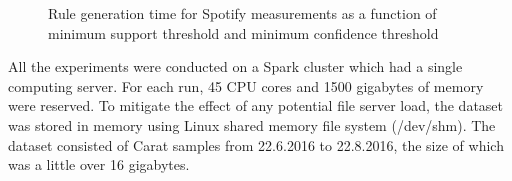 \begin{figure}[htp]



\caption{Rule generation time for Spotify measurements as a function of minimum support threshold and minimum confidence threshold}
\label{figure:runtimes-spotify}
\end{figure}

All the experiments were conducted on a Spark cluster which had a single computing server. For each run, 45 CPU cores and 1500 gigabytes of memory were reserved. To mitigate the effect of any potential file server load, the dataset was stored in memory using Linux shared memory file system (/dev/shm). The dataset consisted of Carat samples from 22.6.2016 to 22.8.2016, the size of which was a little over 16 gigabytes.



